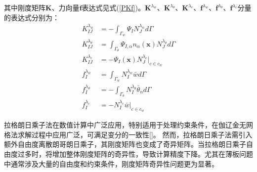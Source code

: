 其中刚度矩阵$\pmb{K}$、力向量$\pmb{f}$表达式见式(\ref{PKf})。$\pmb K^{\lambda_w}$、$\pmb K^{\lambda_\theta}$、$\pmb K^{\lambda_c}$、$\pmb f^{\lambda_w}$、$\pmb f^{\lambda_\theta}$、$\pmb f^{\lambda_c}$分量的表达式分别为：
\begin{align}
    K_{IJ}^{\lambda_w}&=-\int_{\Gamma_w}\Psi_IN_J^{\lambda_w}d\Gamma\\
    K_{IJ}^{\lambda_\theta}&=\int_{\Gamma_\theta}\Psi_{I,\alpha}n_\alpha(\pmb{x})N_J^{\lambda_\theta}d\Gamma\\
    K_{IJ}^{\lambda_c}&=-\Psi_I(\pmb{x})N_J^{\lambda_c}\vert_{c\in c_w}\\
    f_I^{\lambda_w}&=\int_{\Gamma_w}N_I^{\lambda_w}\bar{w}d\Gamma\\
    f_I^{\lambda_\theta}&=-\int_{\Gamma_\theta}N_I^{\lambda_\theta}\bar{\theta}_nd\Gamma\\
    f_I^{\lambda_c}&=-N_I^{\lambda_c}\bar{w}\vert_{c\in c_w}
\end{align}\par
拉格朗日乘子法在数值计算中广泛应用，特别适用于处理约束条件，在伽辽金无网格法求解过程中应用广泛，可满足变分的一致性[]。
然而，拉格朗日乘子法需引入额外自由度离散朗哥朗日乘子，其刚度矩阵也变成了奇异矩阵。当拉格朗日乘子自由度过多时，将增加整体刚度矩阵的奇异性，导致计算精度下降。尤其在薄板问题中通常涉及大量的自由度和约束条件，刚度矩阵奇异性问题更为显著。
